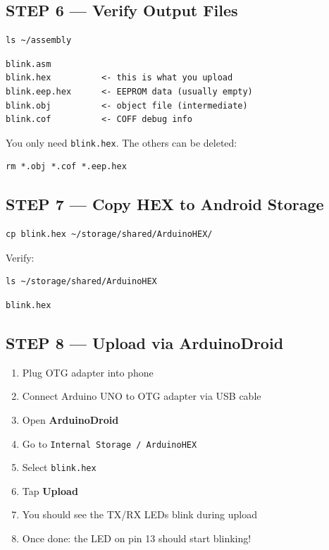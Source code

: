 \documentclass[12pt,a4paper,openany]{report}
\begin{document}
\subsection{STEP 6 --- Verify Output Files}

\begin{lstlisting}[style=shell]
ls ~/assembly
\end{lstlisting}

\begin{lstlisting}[style=terminal]
blink.asm
blink.hex          <- this is what you upload
blink.eep.hex      <- EEPROM data (usually empty)
blink.obj          <- object file (intermediate)
blink.cof          <- COFF debug info
\end{lstlisting}

You only need \texttt{blink.hex}. The others can be deleted:

\begin{lstlisting}[style=shell]
rm *.obj *.cof *.eep.hex
\end{lstlisting}

\subsection{STEP 7 --- Copy HEX to Android Storage}

\begin{lstlisting}[style=shell]
cp blink.hex ~/storage/shared/ArduinoHEX/
\end{lstlisting}

Verify:

\begin{lstlisting}[style=shell]
ls ~/storage/shared/ArduinoHEX
\end{lstlisting}

\begin{lstlisting}[style=terminal]
blink.hex
\end{lstlisting}

\subsection{STEP 8 --- Upload via ArduinoDroid}

\begin{enumerate}[label=\color{TermGreen}\ttfamily\bfseries\arabic*., leftmargin=*, itemsep=6pt]
  \item Plug OTG adapter into phone
  \item Connect Arduino UNO to OTG adapter via USB cable
  \item Open \textbf{ArduinoDroid}
  \item Go to \texttt{Internal Storage / ArduinoHEX}
  \item Select \texttt{blink.hex}
  \item Tap \textbf{Upload}
  \item You should see the TX/RX LEDs blink during upload
  \item Once done: the LED on pin 13 should start blinking!
\end{enumerate}
\end{document}
